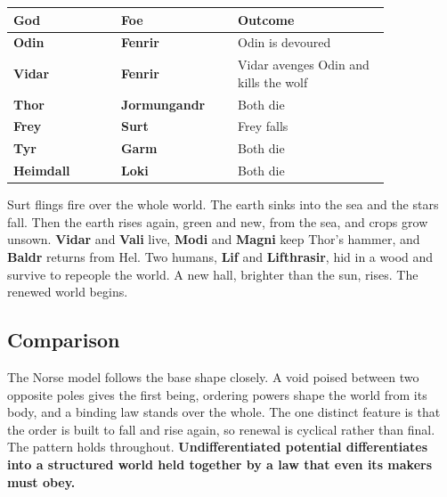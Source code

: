 \begin{longtable}{L{0.24\linewidth}
L{0.26\linewidth} L{0.34\linewidth}}
\toprule
\textbf{God} & \textbf{Foe} & \textbf{Outcome} \\
\midrule
\textbf{Odin} & \textbf{Fenrir} & Odin is devoured \\
\textbf{Vidar} & \textbf{Fenrir} & Vidar avenges Odin and kills the wolf \\
\textbf{Thor} & \textbf{Jormungandr} & Both die \\
\textbf{Frey} & \textbf{Surt} & Frey falls \\
\textbf{Tyr} & \textbf{Garm} & Both die \\
\textbf{Heimdall} & \textbf{Loki} & Both die \\
\bottomrule
\end{longtable}

Surt flings fire over the whole world. The earth sinks into the sea and the stars fall. Then the earth rises again, green and new, from the sea, and crops grow unsown. \textbf{Vidar} and \textbf{Vali} live, \textbf{Modi} and \textbf{Magni} keep Thor's hammer, and \textbf{Baldr} returns from Hel. Two humans, \textbf{Lif} and \textbf{Lifthrasir}, hid in a wood and survive to repeople the world. A new hall, brighter than the sun, rises. The renewed world begins.

\subsection{Comparison}

The Norse model follows the base shape closely. A void poised between two opposite poles gives the first being, ordering powers shape the world from its body, and a binding law stands over the whole. The one distinct feature is that the order is built to fall and rise again, so renewal is cyclical rather than final. The pattern holds throughout. \textbf{Undifferentiated potential differentiates into a structured world held together by a law that even its makers must obey.}
